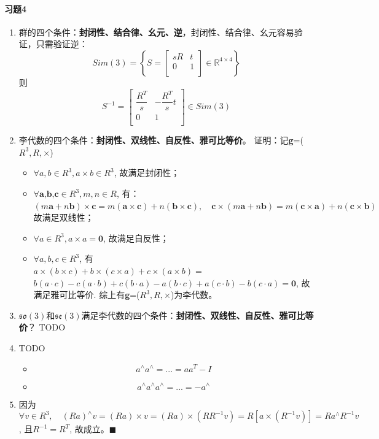 \documentclass[12pt,a4paper]{ctexart}
\begin{document}
\paragraph{习题4}
\begin{enumerate}
	\item 群的四个条件：\textbf{封闭性、结合律、幺元、逆}，封闭性、结合律、幺元容易验证，只需验证逆：
	\begin{equation}\label{key}
	Sim(3)=
	\left\lbrace 
	S=
	\begin{bmatrix}
	sR&t\\
	0 &1\\
	\end{bmatrix}
	\in
	\mathbb{R}^{4\times 4}
	\right\rbrace 
	\end{equation}
	则
	\begin{equation}\label{key}
	S^{-1}=
	\begin{bmatrix}
	\dfrac{R^{T}}{s}&-\dfrac{R^{T}}{s}t\\
	0 &1\\
	\end{bmatrix}
	\in Sim(3)
	\end{equation}
	\item 李代数的四个条件：\textbf{封闭性、双线性、自反性、雅可比等价}。
	证明：记\textbf{g}=($ R^{3},R,\times $)
	\begin{itemize}
		\item $ \forall a,b \in R^{3},a\times b\in R^{3} $, 故满足封闭性；
		\item $ \forall \textbf{a,b,c} \in R^{3}, m,n\in R $, 有：\\
		$ (m\textbf{a}+n\textbf{b})\times \textbf{c}=m(\textbf{a}\times \textbf{c})+n(\textbf{b}\times \textbf{c}),\quad \textbf{c}\times (m\textbf{a}+n\textbf{b})=m(\textbf{c}\times \textbf{a})+n(\textbf{c}\times \textbf{b}) $\\
		故满足双线性；
		\item $ \forall a\in R^{3}, a\times a=\textbf{0} $, 故满足自反性；
		\item $ \forall a,b,c\in R^{3} $, 有\\
		$ a\times(b\times c)+b\times(c\times a)+c\times(a\times b) = $\\
		$ b(a\cdot c)-c(a\cdot b) + c(b\cdot a)-a(b\cdot c) + a(c\cdot b)-b(c\cdot a)=\textbf{0}$, 故满足雅可比等价. 综上有\textbf{g}=($ R^{3},R,\times $)为李代数。
	\end{itemize}
	
	\item $ \mathfrak{so(3)} $和$ \mathfrak{se(3)} $满足李代数的四个条件：\textbf{封闭性、双线性、自反性、雅可比等价}？ TODO
	\item TODO
		\begin{itemize}
			\item $$a^{\wedge}a^{\wedge}=...=aa^T-I$$
			\item $$a^{\wedge}a^{\wedge}a^{\wedge}=...=-a^{\wedge}$$
		\end{itemize}
	\item 因为
	$$
	\forall v\in R^{3}, \quad (Ra)^{\wedge}v=(Ra)\times v=(Ra)\times(RR^{-1}v)=R[a\times (R^{-1}v)]=Ra^{\wedge}R^{-1}v
	$$, 且$ R^{-1}=R^{T} $, 故成立。$ \blacksquare $
	

\end{enumerate}
\end{document}
